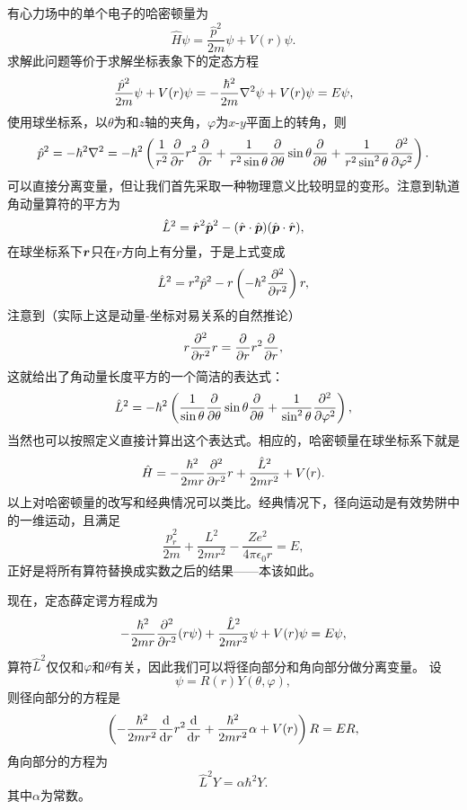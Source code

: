\documentclass[UTF8, a4paper]{ctexart}
\begin{document}
有心力场中的单个电子的哈密顿量为
\begin{equation}
    \hat{H} \psi = \frac{\hat{p}^2}{2m} \psi + V(r) \psi.
\end{equation}
求解此问题等价于求解坐标表象下的定态方程
\begin{equation}
    \frac{\hat{p}^2}{2m} \psi + V(r) \psi = - \frac{\hbar^2}{2m} \laplacian \psi + V(r) \psi = E \psi,
    \label{eq:centered-force-eq}
\end{equation}
使用球坐标系，以$\theta$为和$z$轴的夹角，$\varphi$为$x$-$y$平面上的转角，则
\[
    \hat{p}^2 = -\hbar^2 \laplacian = - \hbar^2 \left( \frac{1}{r^2} \pdv{r} r^2 \pdv{r} + \frac{1}{r^2 \sin \theta} \pdv{\theta} \sin \theta \pdv{\theta} + \frac{1}{r^2 \sin^2 \theta} \pdv[2]{\varphi} \right) .
\]
可以直接分离变量，但让我们首先采取一种物理意义比较明显的变形。注意到轨道角动量算符的平方为
\[
    \hat{L}^2 = \hat{\vb*{r}}^2 \hat{\vb*{p}}^2 - (\hat{\vb*{r}} \cdot \hat{\vb*{p}}) (\hat{\vb*{p}} \cdot \hat{\vb*{r}}),
\]
在球坐标系下$\vb*{r}$只在$r$方向上有分量，于是上式变成
\[
    \hat{L}^2 = r^2 \hat{p}^2 - r \left( - \hbar^2 \pdv[2]{r} \right) r,
\]
注意到（实际上这是动量-坐标对易关系的自然推论）
\[
    r \pdv[2]{r} r = \pdv{r} r^2 \pdv{r},
\]
这就给出了角动量长度平方的一个简洁的表达式：
\begin{equation}
    \hat{L}^2 = - \hbar^2 \left( \frac{1}{\sin \theta} \pdv{\theta} \sin \theta \pdv{\theta} + \frac{1}{\sin^2 \theta} \pdv[2]{\varphi} \right),
\end{equation}
当然也可以按照定义直接计算出这个表达式。相应的，哈密顿量在球坐标系下就是
\[
    \hat{H} = - \frac{\hbar^2}{2 m r} \pdv[2]{r} r + \frac{\hat{L}^2}{2 m r^2} + V(r).
\]
以上对哈密顿量的改写和经典情况可以类比。经典情况下，径向运动是有效势阱中的一维运动，且满足
\[
    \frac{p_r^2}{2m} + \frac{L^2}{2mr^2} - \frac{Ze^2}{4\pi \epsilon_0 r} = E,
\]
正好是将所有算符替换成实数之后的结果——本该如此。

现在，定态薛定谔方程成为
\[
    - \frac{\hbar^2}{2 m r} \pdv[2]{r} (r \psi) + \frac{\hat{L}^2}{2 m r^2} \psi + V(r) \psi = E \psi,
\]
算符$\hat{L}^2$仅仅和$\varphi$和$\theta$有关，因此我们可以将径向部分和角向部分做分离变量。
设
\[
    \psi = R(r) Y(\theta, \varphi),
\]
则径向部分的方程是
\begin{equation}
    \left( - \frac{\hbar^2}{2m r^2} \dv{r} r^2 \dv{r} + \frac{\hbar^2}{2m r^2} \alpha + V(r) \right) R = E R,
    \label{eq:original-r-equation}
\end{equation}
角向部分的方程为
\begin{equation}
    \hat{L}^2 Y = \alpha \hbar^2 Y.
    \label{eq:angle-equation}
\end{equation}
其中$\alpha$为常数。
\end{document}
